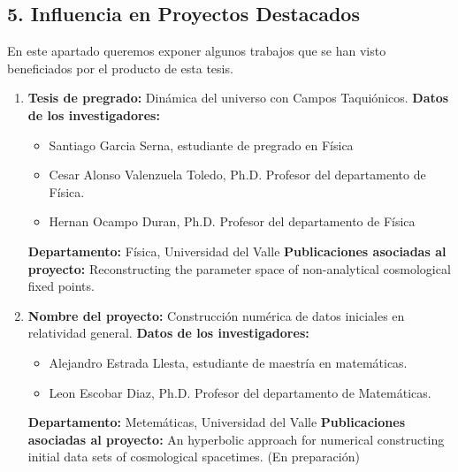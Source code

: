 \begin{spacing}{1.5}
  \begin{tightcenter}
    \section{5. Influencia en Proyectos Destacados}
  \end{tightcenter}

  En este apartado queremos exponer algunos trabajos que se han visto
  beneficiados por el producto de esta tesis.

  \begin{enumerate}

    \item \textbf{Tesis de pregrado:} Dinámica del universo con Campos
          Taquiónicos. \newline
          \textbf{Datos de los investigadores:}
          \begin{itemize}
            \item Santiago Garcia Serna, estudiante de pregrado en Física
            \item Cesar Alonso Valenzuela Toledo, Ph.D. Profesor del
                  departamento de Física.
            \item Hernan Ocampo Duran, Ph.D. Profesor del departamento de
                  Física
          \end{itemize}
          \textbf{Departamento: } Física, Universidad del Valle \newline
          \textbf{Publicaciones asociadas al proyecto: } \newline Reconstructing
          the parameter space of non-analytical cosmological fixed points.\cite{Tesis1}

    \item \textbf{Nombre del proyecto:} Construcción numérica de datos
          iniciales en relatividad general. \newline
          \textbf{Datos de los investigadores:}
          \begin{itemize}
            \item Alejandro Estrada Llesta, estudiante de maestría en
                  matemáticas.
            \item Leon Escobar Diaz, Ph.D. Profesor del departamento de
                  Matemáticas.
          \end{itemize}
          \textbf{Departamento: } Metemáticas, Universidad del Valle \newline
          \textbf{Publicaciones asociadas al proyecto: } \newline An hyperbolic
          approach for numerical constructing initial data sets of cosmological
          spacetimes. (En preparación)


\end{enumerate}
\end{spacing}
